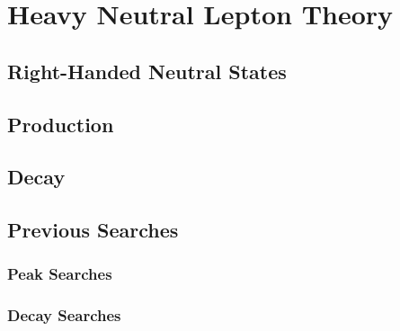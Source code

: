 
\chapter{Heavy Neutral Lepton Theory}

\section{Right-Handed Neutral States}

\section{Production}

\section{Decay}

\section{Previous Searches}

\subsection{Peak Searches}

\subsection{Decay Searches}

